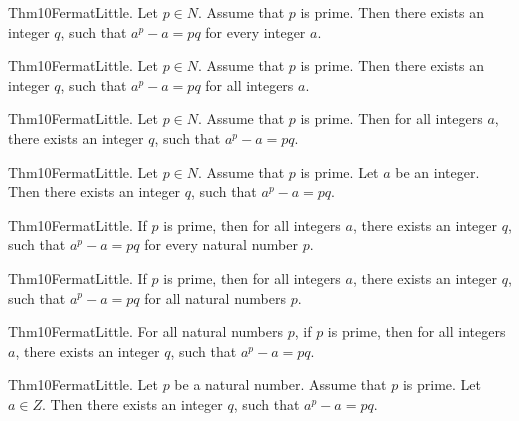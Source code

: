 \documentclass{article}
\begin{document}
Thm10FermatLittle. Let $p \in N$. Assume that $p$ is prime. Then there exists an integer $q$, such that $a ^ {p}- a = p q$ for every integer $a$.

Thm10FermatLittle. Let $p \in N$. Assume that $p$ is prime. Then there exists an integer $q$, such that $a ^ {p}- a = p q$ for all integers $a$.

Thm10FermatLittle. Let $p \in N$. Assume that $p$ is prime. Then for all integers $a$, there exists an integer $q$, such that $a ^ {p}- a = p q$.

Thm10FermatLittle. Let $p \in N$. Assume that $p$ is prime. Let $a$ be an integer. Then there exists an integer $q$, such that $a ^ {p}- a = p q$.

Thm10FermatLittle. If $p$ is prime, then for all integers $a$, there exists an integer $q$, such that $a ^ {p}- a = p q$ for every natural number $p$.

Thm10FermatLittle. If $p$ is prime, then for all integers $a$, there exists an integer $q$, such that $a ^ {p}- a = p q$ for all natural numbers $p$.

Thm10FermatLittle. For all natural numbers $p$, if $p$ is prime, then for all integers $a$, there exists an integer $q$, such that $a ^ {p}- a = p q$.

Thm10FermatLittle. Let $p$ be a natural number. Assume that $p$ is prime. Let $a \in Z$. Then there exists an integer $q$, such that $a ^ {p}- a = p q$.
\end{document}
